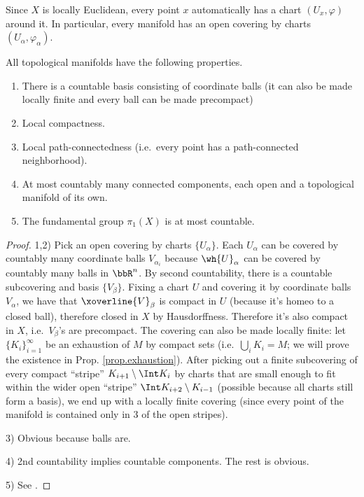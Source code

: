 \begin{rem}
Since $X$ is locally Euclidean, every point $x$ automatically has a chart $(U_x,\varphi)$ around it. In particular, every manifold has an open covering by charts $(U_\alpha,\varphi_\alpha)$.
\end{rem}

\begin{thm} All topological manifolds have the following properties.
\begin{enumerate}
    \item There is a countable basis consisting of coordinate balls (it can also be made locally finite and every ball can be made precompact)
    \item Local compactness.
    \item Local path-connectedness (i.e.\ every point has a path-connected neighborhood).
    \item At most countably many connected components, each open and a topological manifold of its own.
    \item The fundamental group $\pi_1(X)$ is at most countable.
\end{enumerate}
\end{thm}
\begin{proof}
1,2) Pick an open covering by charts $\{U_\alpha\}$. Each $U_\alpha $ can be covered by countably many coordinate balls $V_{\alpha_i}$ because $\wh{U}_\alpha$ can be covered by countably many balls in $\bbR^n$. By second countability, there is a countable subcovering and basis $\{V_\beta\}$. Fixing a chart $U$ and covering it by coordinate balls $V_\alpha$, we have that $\xoverline{V}_\beta$ is compact in $U$ (because it's homeo to a closed ball), therefore closed in $X$ by Hausdorffness. Therefore it's also compact in $X$, i.e.\ $V_\beta$'s are precompact. The covering can also be made locally finite: let $\{K_i\}_{i=1}^\infty$ be an exhaustion of $M$ by compact sets (i.e.\ $\bigcup_i K_i=M$; we will prove the existence in Prop. \ref{prop.exhaustion}). After picking out a finite subcovering of every compact ``stripe'' $K_{i+1}\setminus \Int K_{i}$ by charts that are small enough to fit within the wider open ``stripe'' $\Int K_{i+2}\setminus K_{i-1}$ (possible because all charts still form a basis), we end up with a locally finite covering (since every point of the manifold is contained only in 3 of the open stripes).

3) Obvious because balls are.

4) 2nd countability implies countable components. The rest is obvious.

5) See \cite[Thm 1.16]{Lee}.
\end{proof}

